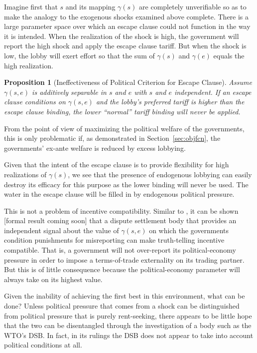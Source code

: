 \documentclass[12pt]{article}
\newtheorem{proposition}{Proposition}
\newcommand{\ga}{\gamma}
\begin{document}
Imagine first that $s$ and its mapping $\ga(s)$ are completely unverifiable so as to make the analogy to the exogenous shocks examined above complete. There is a large parameter space over which an escape clause could not function in the way it is intended. When the realization of the shock is high, the government will report the high shock and apply the escape clause tariff. But when the shock is low, the lobby will exert effort so that the sum of $\ga(s)$ and $\ga(e)$ equals the high realization.

\begin{proposition}[Ineffectiveness of Political Criterion for Escape Clause]
    Assume $\ga(s,e)$ is additively separable in $s$ and $e$ with $s$ and $e$ independent. If an escape clause conditions on $\ga(s,e)$ and the lobby's preferred tariff is higher than the escape clause binding, the lower ``normal'' tariff binding will never be applied.
\end{proposition}

From the point of view of maximizing the political welfare of the governments, this is only problematic if, as demonstrated in Section~\ref{sec:objfcn}, the governments' ex-ante welfare is reduced by excess lobbying.

Given that the intent of the escape clause is to provide flexibility for high realizations of $\ga(s)$, we see that the presence of endogenous lobbying can easily destroy its efficacy for this purpose as the lower binding will never be used. The water in the escape clause will be filled in by endogenous political pressure.

This is not a problem of incentive compatibility. Similar to \Textcite{beshkar2010b}, it can be shown [formal result coming soon] that a dispute settlement body that provides an independent signal about the value of $\ga(s,e)$ on which the governments condition punishments for misreporting can make truth-telling incentive compatible. That is, a government will not over-report its political-economy pressure in order to impose a terms-of-trade externality on its trading partner. But this is of little consequence because the political-economy parameter will always take on its highest value.

Given the inability of achieving the first best in this environment, what can be done? Unless political pressure that comes from a shock can be distinguished from political pressure that is purely rent-seeking, there appears to be little hope that the two can be disentangled through the investigation of a body such as the WTO's DSB. In fact, in its rulings the DSB does not appear to take into account political conditions at all.
\end{document}
